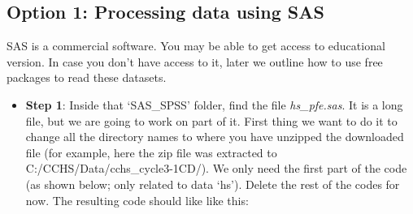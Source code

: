 \documentclass[
]{book}
\newenvironment{Shaded}{\begin{snugshade}}{\end{snugshade}}
\newcommand{\NormalTok}[1]{#1}
\newcommand{\StringTok}[1]{\textcolor[rgb]{0.31,0.60,0.02}{#1}}
\providecommand{\tightlist}{%
  \setlength{\itemsep}{0pt}\setlength{\parskip}{0pt}}
\begin{document}
\hypertarget{option-1-processing-data-using-sas}{%
\subsection{Option 1: Processing data using SAS}\label{option-1-processing-data-using-sas}}

SAS is a commercial software. You may be able to get access to educational version. In case you don't have access to it, later we outline how to use free packages to read these datasets.

\begin{itemize}
\tightlist
\item
  \textbf{Step 1}: Inside that `SAS\_SPSS' folder, find the file \emph{hs\_pfe.sas}. It is a long file, but we are going to work on part of it. First thing we want to do it to change all the directory names to where you have unzipped the downloaded file (for example, here the zip file was extracted to C:/CCHS/Data/cchs\_cycle3-1CD/). We only need the first part of the code (as shown below; only related to data `hs'). Delete the rest of the codes for now. The resulting code should like like this:
\end{itemize}

\begin{Shaded}
\end{Shaded}
\end{document}
